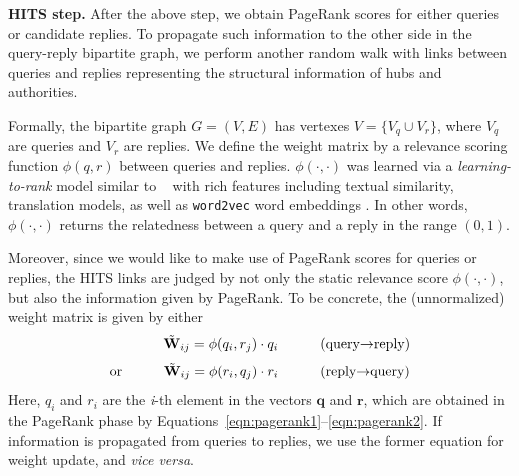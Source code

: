 \documentclass{sig-alternate-05-2015}
\begin{document}
\textbf{HITS step.}
After the above step, we obtain PageRank scores for either queries or candidate replies. To propagate such information to the other side in the query-reply bipartite graph, we perform another random walk with links between queries and replies representing the structural information of hubs and authorities. %



Formally, the bipartite graph $G=(V,E)$ has vertexes  $V=\{V_q \cup V_r\}$, where $V_q$ are queries and $V_r$ are replies. We define the weight matrix by a relevance scoring function $\phi(q,r)$ between queries and replies. $\phi(\cdot,\cdot)$ was learned via a \textit{learning-to-rank} model similar to ~ with rich features including textual similarity, translation models, as well as {\tt word2vec} word embeddings \cite{mikolov2013distributed}. In other words, $\phi(\cdot,\cdot)$ returns the relatedness between a query and a reply in the range $(0,1)$.

Moreover, since we would like to make use of PageRank scores for queries or replies, the HITS links are judged by not only the static relevance score $\phi(\cdot,\cdot)$, but also the information given by PageRank. To be concrete, the (unnormalized) weight matrix is given by either
\begin{equation}
\text{\quad \quad\quad\quad\!}\tilde{\mathbf W}_{ij} = \phi(q_i, r_j)\cdot q_i\quad\quad\quad\text{(query$\rightarrow$reply)}
\label{eqn:w1}
\end{equation}
\begin{equation}
\text{or\quad\quad\quad} \tilde{\mathbf W}_{ij} = \phi(r_i, q_j)\cdot {r}_i\quad\quad\quad\text{(reply$\rightarrow$query)}
\label{eqn:w2}
\end{equation}
Here, $q_i$ and $r_i$ are the \textit{i}-th element in the vectors $\mathbf q$ and $\mathbf r$, which are obtained in the PageRank phase by Equations~\ref{eqn:pagerank1}--\ref{eqn:pagerank2}. If information is propagated from queries to replies, we use the former equation for weight update, and \textit{vice versa}.
\end{document}
